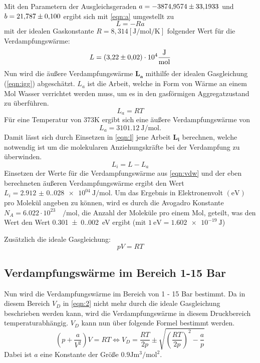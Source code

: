 \noindent Mit den Parametern der Ausgleichsgeraden $a = \num{-3874.9574 +- 33.1933}
$ und $b = \num{21.787 +- 0.10}$ ergibt sich mit \autoref{eqn:a}
umgestellt zu
\begin{equation}
  L = -Ra
\end{equation}
mit der idealen Gaskonstante $R =  8,314[\unit{\joule\per\mol\per\kelvin}] $ 
folgender Wert für die Verdampfungswärme:
\begin{equation}
  \label{eqn:vdw}
  L = \num{3.22 +- 0.02 e4} \unit{\joule\per\mol}
\end{equation}
Nun wird die äußere Verdampfungswärme $\symbf{L_a}$ mithilfe der idealen 
Gasgleichung (\autoref{eqn:igg}) abgeschätzt. $L_a$ ist die Arbeit, welche 
in Form von Wärme an einem Mol Wasser verrichtet werden muss, um es
in den gasförmigen Aggregatzustand zu überführen. 
\begin{equation}
  L_a = RT
\end{equation}
Für eine Temperatur von $373 \unit{\kelvin}$ ergibt sich eine äußere 
Verdampfungswärme von 
\begin{equation*}
  L_a = \qty{3101.12}{\joule\per\mol}.
\end{equation*}
Damit lässt sich durch Einsetzen in \autoref{eqn:l} jene Arbeit $\symbf{L_i}$
berechnen, welche notwendig ist um die molekularen Anziehungskräfte 
bei der Verdampfung zu überwinden.
\begin{equation}
  \label{eqn:l}
  L_i = L - L_a
\end{equation}
Einsetzen der Werte für die Verdampfungswärme aus \autoref{eqn:vdw} und der 
eben berechneten äußeren Verdampfungswärme ergibt den Wert $L_i = \qty{2.912(0.028)e04}{\joule\per\mol}$.
Um das Ergebnis in Elektronenvolt $(\unit{\eV})$ pro Molekül angeben zu können, wird es durch die 
Avogadro Konstante $N_A = 6.022 \cdot 10^23 \quad \unit{\per\mol}$,
die Anzahl der Moleküle pro einem Mol, geteilt, was den Wert den Wert 
\qty{0.301(0.002)}{\eV} ergibt (mit $\qty{1}{\eV} = \qty{1.602e-19}{\joule}$)

Zusätzlich die ideale Gasgleichung:
\begin{equation}
  \label{eqn:igg}
  pV = RT
\end{equation}



\subsection{Verdampfungswärme im Bereich 1-15 Bar}
Nun wird die Verdampfungswärme im Bereich von 1 - 15 Bar bestimmt. 
Da in diesem Bereich $V_D$ in \autoref{eqn:2} nicht mehr durch die ideale 
Gasgleichung beschrieben werden kann, wird die Verdampfungswärme in diesem 
Druckbereich temperaturabhängig. $V_D$ kann nun über folgende Formel bestimmt 
werden.
\begin{equation}
  \left(p + \frac{a}{V^2}\right)V = RT \Leftrightarrow V_D = \frac{RT}{2p} \pm \sqrt{\left(\frac{RT}{2p}\right)^2-\frac{a}{p}}
\end{equation}
Dabei ist $a$ eine Konstante der Größe $0.9 \unit{\joule\cubic\meter\per\square\mole}$.

